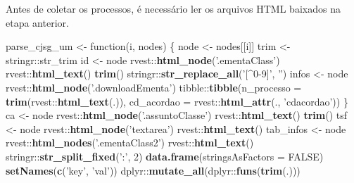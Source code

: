 \documentclass[]{book}
\newenvironment{Shaded}{\begin{snugshade}}{\end{snugshade}}
\newcommand{\KeywordTok}[1]{\textcolor[rgb]{0.13,0.29,0.53}{\textbf{{#1}}}}
\newcommand{\DataTypeTok}[1]{\textcolor[rgb]{0.13,0.29,0.53}{{#1}}}
\newcommand{\DecValTok}[1]{\textcolor[rgb]{0.00,0.00,0.81}{{#1}}}
\newcommand{\StringTok}[1]{\textcolor[rgb]{0.31,0.60,0.02}{{#1}}}
\newcommand{\OtherTok}[1]{\textcolor[rgb]{0.56,0.35,0.01}{{#1}}}
\newcommand{\NormalTok}[1]{{#1}}
\begin{document}
Antes de coletar os processos, é necessário ler os arquivos HTML
baixados na etapa anterior.

\begin{Shaded}
\begin{Highlighting}[]
\NormalTok{parse_cjsg_um <-}\StringTok{ }\NormalTok{function(i, nodes) \{}
  \NormalTok{node <-}\StringTok{ }\NormalTok{nodes[[i]]}
  \NormalTok{trim <-}\StringTok{ }\NormalTok{stringr::str_trim}
  \NormalTok{id <-}\StringTok{ }\NormalTok{node %>%}
\StringTok{    }\NormalTok{rvest::}\KeywordTok{html_node}\NormalTok{(}\StringTok{'.ementaClass'}\NormalTok{) %>%}
\StringTok{    }\NormalTok{rvest::}\KeywordTok{html_text}\NormalTok{() %>%}
\StringTok{    }\KeywordTok{trim}\NormalTok{() %>%}
\StringTok{    }\NormalTok{stringr::}\KeywordTok{str_replace_all}\NormalTok{(}\StringTok{'[^0-9]'}\NormalTok{, }\StringTok{''}\NormalTok{)}
  \NormalTok{infos <-}\StringTok{ }\NormalTok{node %>%}
\StringTok{    }\NormalTok{rvest::}\KeywordTok{html_node}\NormalTok{(}\StringTok{'.downloadEmenta'}\NormalTok{) %>%}\StringTok{ }\NormalTok{\{}
      \NormalTok{tibble::}\KeywordTok{tibble}\NormalTok{(}\DataTypeTok{n_processo =} \KeywordTok{trim}\NormalTok{(rvest::}\KeywordTok{html_text}\NormalTok{(.)),}
                     \DataTypeTok{cd_acordao =} \NormalTok{rvest::}\KeywordTok{html_attr}\NormalTok{(., }\StringTok{'cdacordao'}\NormalTok{))}
    \NormalTok{\}}
  \NormalTok{ca <-}\StringTok{ }\NormalTok{node %>%}
\StringTok{    }\NormalTok{rvest::}\KeywordTok{html_node}\NormalTok{(}\StringTok{'.assuntoClasse'}\NormalTok{) %>%}
\StringTok{    }\NormalTok{rvest::}\KeywordTok{html_text}\NormalTok{() %>%}
\StringTok{    }\KeywordTok{trim}\NormalTok{()}
  \NormalTok{tsf <-}\StringTok{ }\NormalTok{node %>%}
\StringTok{    }\NormalTok{rvest::}\KeywordTok{html_node}\NormalTok{(}\StringTok{'textarea'}\NormalTok{) %>%}
\StringTok{    }\NormalTok{rvest::}\KeywordTok{html_text}\NormalTok{()}
  \NormalTok{tab_infos <-}\StringTok{ }\NormalTok{node %>%}
\StringTok{    }\NormalTok{rvest::}\KeywordTok{html_nodes}\NormalTok{(}\StringTok{'.ementaClass2'}\NormalTok{) %>%}
\StringTok{    }\NormalTok{rvest::}\KeywordTok{html_text}\NormalTok{() %>%}
\StringTok{    }\NormalTok{stringr::}\KeywordTok{str_split_fixed}\NormalTok{(}\StringTok{':'}\NormalTok{, }\DecValTok{2}\NormalTok{) %>%}
\StringTok{    }\KeywordTok{data.frame}\NormalTok{(}\DataTypeTok{stringsAsFactors =} \OtherTok{FALSE}\NormalTok{) %>%}
\StringTok{    }\KeywordTok{setNames}\NormalTok{(}\KeywordTok{c}\NormalTok{(}\StringTok{'key'}\NormalTok{, }\StringTok{'val'}\NormalTok{)) %>%}
\StringTok{    }\NormalTok{dplyr::}\KeywordTok{mutate_all}\NormalTok{(dplyr::}\KeywordTok{funs}\NormalTok{(}\KeywordTok{trim}\NormalTok{(.))) %>%}
}}}}}}}}}}}}}}}}}}
\end{Highlighting}
\end{Shaded}
\end{document}
